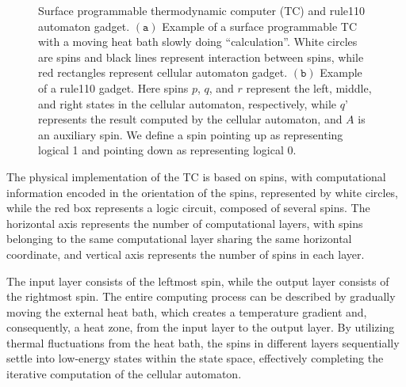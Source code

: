 \documentclass[twocolumn,superscriptaddress,english,showpacs,longbibliography]{revtex4-2}
\begin{document}
\begin{figure}[h]
    \caption{Surface programmable thermodynamic computer (TC) and rule110 automaton gadget. $\mathtt{(a)}$ Example of a surface programmable TC with a moving heat bath slowly doing ``calculation''. White circles are spins and black lines represent interaction between spins, while red rectangles represent cellular automaton gadget. $\mathtt{(b)}$ Example of a rule110 gadget. Here spins $p$, $q$, and $r$ represent the left, middle, and right states in the cellular automaton, respectively, while $q’$ represents the result computed by the cellular automaton, and $A$ is an auxiliary spin. We define a spin pointing up as representing logical 1 and pointing down as representing logical 0. }
    \label{Surface-programmable-thermodynamic computer}
\end{figure}

The physical implementation of the TC is based on spins, with computational information encoded in the orientation of the spins, represented by white circles, while the red box represents a logic circuit, composed of several spins. The horizontal axis represents the number of computational layers, with spins belonging to the same computational layer sharing the same horizontal coordinate, and vertical axis represents the number of spins in each layer. 

The input layer consists of the leftmost spin, while the output layer consists of the rightmost spin. The entire computing process can be described by gradually moving the external heat bath, which creates a temperature gradient and, consequently, a heat zone, from the input layer to the output layer. By utilizing thermal fluctuations from the heat bath, the spins in different layers sequentially settle into low-energy states within the state space, effectively completing the iterative computation of the cellular automaton.
\end{document}
